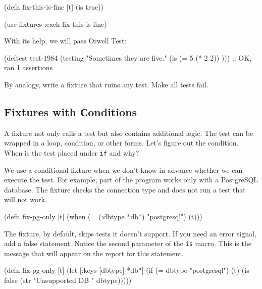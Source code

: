\begin{english}
  \begin{clojure}
(defn fix-this-is-fine [t]
  (is true))

(use-fixtures :each fix-this-is-fine)
  \end{clojure}
\end{english}


With its help, we will pass Orwell Test:

\begin{english}
  \begin{clojure}
(deftest test-1984
  (testing "Sometimes they are five."
    (is (= 5 (* 2 2)) )))
;; OK, ran 1 assertions
  \end{clojure}
\end{english}

By analogy, write a fixture that ruins any test. Make all tests fail.

\subsection{Fixtures with Сonditions}


A fixture not only calls a test but also contains additional logic. The test can be wrapped in a loop, condition, or other forms. Let's figure out the condition. When is the test placed under \verb|if| and why?

We use a conditional fixture when we don't know in advance whether we can execute the test. For example, part of the program works only with a PostgreSQL database. The fixture checks the connection type and does not run a test that will not work.

\begin{english}
  \begin{clojure}
(defn fix-pg-only [t]
  (when (= (:dbtype *db*) "postgresql")
    (t)))
  \end{clojure}
\end{english}

The fixture, by default, skips tests it doesn't support. If you need an error signal, add a false statement. Notice the second parameter of the \verb|is| macro. This is the message that will appear on the report for this statement.

\ifx\DEVICETYPE\MOBILE

\begin{english}
  \begin{clojure}
(defn fix-pg-only [t]
  (let [{:keys [dbtype]} *db*]
    (if (= dbtype "postgresql")
      (t)
      (is false
        (str "Unsupported DB "
          dbtype)))))
  \end{clojure}
\end{english}

